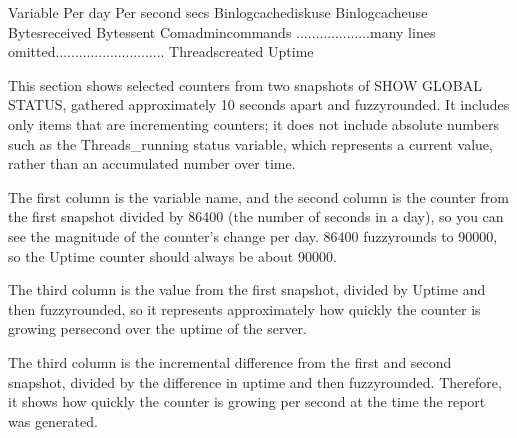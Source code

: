 \documentclass[letterpaper,10pt,english]{sphinxmanual}
\begin{document}
\begin{sphinxVerbatim}[commandchars=\\\{\}]
Variable                            Per day  Per second      secs
Binlog\PYGZus{}cache\PYGZus{}disk\PYGZus{}use                     
Binlog\PYGZus{}cache\PYGZus{}use                         
Bytes\PYGZus{}received                                       
Bytes\PYGZus{}sent                                          
Com\PYGZus{}admin\PYGZus{}commands                        
...................many lines omitted............................
Threads\PYGZus{}created                                                 
Uptime                                                      
\end{sphinxVerbatim}

This section shows selected counters from two snapshots of SHOW GLOBAL STATUS,
gathered approximately 10 seconds apart and fuzzy\sphinxhyphen{}rounded. It includes only
items that are incrementing counters; it does not include absolute numbers such
as the Threads\_running status variable, which represents a current value, rather
than an accumulated number over time.

The first column is the variable name, and the second column is the counter from
the first snapshot divided by 86400 (the number of seconds in a day), so you can
see the magnitude of the counter’s change per day. 86400 fuzzy\sphinxhyphen{}rounds to 90000,
so the Uptime counter should always be about 90000.

The third column is the value from the first snapshot, divided by Uptime and
then fuzzy\sphinxhyphen{}rounded, so it represents approximately how quickly the counter is
growing per\sphinxhyphen{}second over the uptime of the server.

The third column is the incremental difference from the first and second
snapshot, divided by the difference in uptime and then fuzzy\sphinxhyphen{}rounded. Therefore,
it shows how quickly the counter is growing per second at the time the report
was generated.
\end{document}
